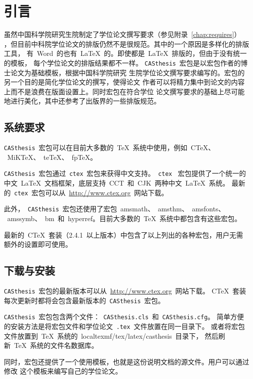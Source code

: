 
\chapter{引言}
\label{chap:introduction}

虽然中国科学院研究生院制定了学位论文撰写要求（参见附录~\ref{chap:requires}）
，但目前中科院学位论文的排版仍然不是很规范。其中的一个原因是多样化的排版工具，
有~Word~的也有~\LaTeX{}~的。即使都是~\LaTeX{}~排版的，但由于没有统一的模板，
每个学位论文的排版结果都不一样。
\texttt{CASthesis}~宏包是以宏包作者的博士论文为基础模板，根据中国科学院研究
生院学位论文撰写要求编写的。宏包的另一个目的是简化学位论文的撰写，使得论文
作者可以将精力集中到论文的内容上而不是浪费在版面设置上。同时宏包在符合学位
论文撰写要求的基础上尽可能地进行美化，其中还参考了出版界的一些排版规范。

\section{系统要求}

\texttt{CASthesis}~宏包可以在目前大多数的~\TeX{}~系统中使用，例如~C\TeX{}、
~MiK\TeX{}、~te\TeX{}、~fp\TeX{}。

\texttt{CASthesis}~宏包通过~\texttt{ctex}~宏包来获得中文支持。~\texttt{ctex}~
宏包提供了一个统一的中文~\LaTeX{}~文档框架，底层支持~CCT~和~CJK~两种中文~\LaTeX{}~系统。
最新的~\texttt{ctex}~宏包可以从~\url{http://www.ctex.org}~网站下载。

此外，~\texttt{CASthesis}~宏包还使用了宏包~amsmath、~amsthm、~amsfonts、
~amssymb、~bm~和~hyperref。目前大多数的~\TeX{}~系统中都包含有这些宏包。

最新的~C\TeX{}~套装（2.4.1~以上版本）中包含了以上列出的各种宏包，用户无需额外的设置即可使用。

\section{下载与安装}

\texttt{CASthesis}~宏包的最新版本可以从~\url{http://www.ctex.org}~网站下载。
C\TeX{}~套装每次更新时都将会包含最新版本的~\texttt{CASthesis}~宏包。

\texttt{CASthesis}~宏包包含两个文件：~\texttt{CASthesis.cls}~和~\texttt{CASthesis.cfg}。
简单方便的安装方法是将宏包文件和学位论文~\texttt{.tex}~文件放置在同一目录下。
或者将宏包文件放置到~\TeX{}~系统的~localtexmf/tex/latex/casthesis~目录下，
然后刷新~\TeX{}~系统的文件名数据库。

同时，宏包还提供了一个使用模板，也就是这份说明文档的源文件。用户可以通过修改
这个模板来编写自己的学位论文。

